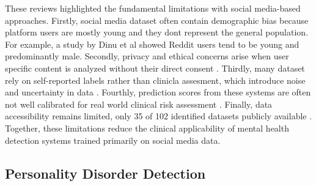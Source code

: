 \documentclass{article}
\begin{document}
These reviews highlighted the fundamental limitations with  social media-based approaches. Firstly, social media dataset often contain demographic bias because platform users are mostly young and they dont represent the general population. For example, a study by Dinu et al \cite{dinu2021automatic} showed Reddit users tend to be young and predominantly male. Secondly, privacy and ethical concerns arise when user specific content is analyzed without their direct consent \cite{montejo2024survey}. Thirdly, many dataset rely on self-reported labels rather than clinicla assesment, which introduce noise and uncertainty in data \cite{jiang-etal-2020-detection}. Fourthly, prediction scores from these systems are often not well calibrated for real world clinical risk assessment \cite{jiang-etal-2020-detection}. Finally, data accessibility remains limited, only 35 of 102 identified datasets publicly available \cite{harrigian2021state}. Together, these limitations reduce the clinical applicability of mental health detection systems trained primarily on social media data.
























\subsection{Personality Disorder Detection}

\end{document}
